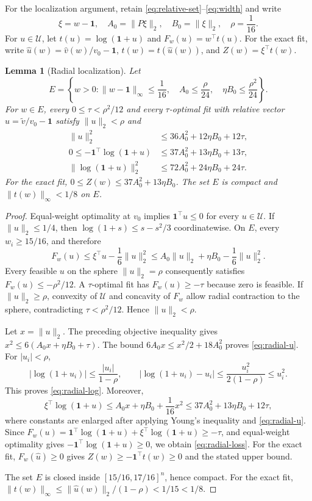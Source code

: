 \documentclass[11pt]{article}
\newtheorem{lemma}[theorem]{Lemma}
\theoremstyle{definition}
\theoremstyle{remark}
\newcommand{\Ucal}{\mathcal U}
\newcommand{\one}{\bm 1}
\newcommand{\norm}[1]{\lVert #1\rVert}
\newcommand{\abs}[1]{\lvert #1\rvert}
\newcommand{\vhat}{\widehat v}
\newcommand{\vtil}{\widetilde v}
\begin{document}
For the localization argument, retain \eqref{eq:relative-set}--\eqref{eq:width}
and write
\[
 \xi=w-\one,\quad A_0=\norm{P\xi}_2,\quad B_0=\norm{\xi}_2,
 \quad \rho=\frac1{16}.
\]
For $u\in\Ucal$, let $t(u)=\log(\one+u)$ and
$F_w(u)=w^\top t(u)$.  For the exact fit, write
$\widehat u(w)=\vhat(w)/v_0-\one$, $t(w)=t(\widehat u(w))$, and
$Z(w)=\xi^\top t(w)$.

\begin{lemma}[Radial localization]
\label{lem:radial}
Let
\begin{equation}\label{eq:localization-event}
 E=\left\{w>0:
\norm{w-\one}_\infty\le\frac1{16},\quad
 A_0\le\frac{\rho}{24},\quad \eta B_0\le\frac{\rho^2}{24}\right\}.
\end{equation}
For $w\in E$, every $0\le\tau<\rho^2/12$ and every $\tau$-optimal fit with
relative vector $u=\vtil/v_0-\one$ satisfy $\norm{u}_2<\rho$ and
\begin{align}
 \norm{u}_2^2&\le36A_0^2+12\eta B_0+12\tau,\label{eq:radial-u}\\
 0\le-\one^\top\log(\one+u)
 &\le37A_0^2+13\eta B_0+13\tau,\label{eq:radial-loss}\\
 \norm{\log(\one+u)}_2^2
 &\le72A_0^2+24\eta B_0+24\tau.\label{eq:radial-log}
\end{align}
For the exact fit, $0\le Z(w)\le37A_0^2+13\eta B_0$.  The set $E$ is
compact and $\norm{t(w)}_\infty<1/8$ on $E$.
\end{lemma}

\begin{proof}
Equal-weight optimality at $v_0$ implies
$\one^\top u\le0$ for every $u\in\Ucal$.  If $\norm{u}_2\le1/4$, then
$\log(1+s)\le s-s^2/3$ coordinatewise.  On $E$, every $w_i\ge15/16$, and
therefore
\[
 F_w(u)\le \xi^\top u-\frac16\norm{u}_2^2
 \le A_0\norm{u}_2+\eta B_0-\frac16\norm{u}_2^2.
\]
Every feasible $u$ on the sphere $\norm{u}_2=\rho$ consequently satisfies
$F_w(u)\le-\rho^2/12$.  A $\tau$-optimal fit has
$F_w(u)\ge-\tau$ because zero is feasible.  If $\norm{u}_2\ge\rho$, convexity
of $\Ucal$ and concavity of $F_w$ allow radial contraction to the sphere,
contradicting $\tau<\rho^2/12$.  Hence $\norm{u}_2<\rho$.

Let $x=\norm{u}_2$.  The preceding objective inequality gives
$x^2\le6(A_0x+\eta B_0+\tau)$.  The bound
$6A_0x\le x^2/2+18A_0^2$ proves \eqref{eq:radial-u}.  For
$\abs{u_i}<\rho$,
\[
 \abs{\log(1+u_i)}\le\frac{\abs{u_i}}{1-\rho},
 \qquad
 \abs{\log(1+u_i)-u_i}\le\frac{u_i^2}{2(1-\rho)}\le u_i^2.
\]
This proves \eqref{eq:radial-log}.  Moreover,
\[
 \xi^\top\log(\one+u)
 \le A_0x+\eta B_0+\frac1{16}x^2
 \le37A_0^2+13\eta B_0+12\tau,
\]
where constants are enlarged after applying Young's inequality and
\eqref{eq:radial-u}.  Since
$F_w(u)=\one^\top\log(\one+u)+\xi^\top\log(\one+u)\ge-\tau$, and equal-weight
optimality gives $-\one^\top\log(\one+u)\ge0$, we obtain
\eqref{eq:radial-loss}.  For the exact fit, $F_w(\widehat u)\ge0$ gives
$Z(w)\ge-\one^\top t(w)\ge0$ and the stated upper bound.

The set $E$ is closed inside $[15/16,17/16]^n$, hence compact.  For the exact
fit, $\norm{t(w)}_\infty\le\norm{\widehat u(w)}_2/(1-\rho)<1/15<1/8$.
\end{proof}
\end{document}
